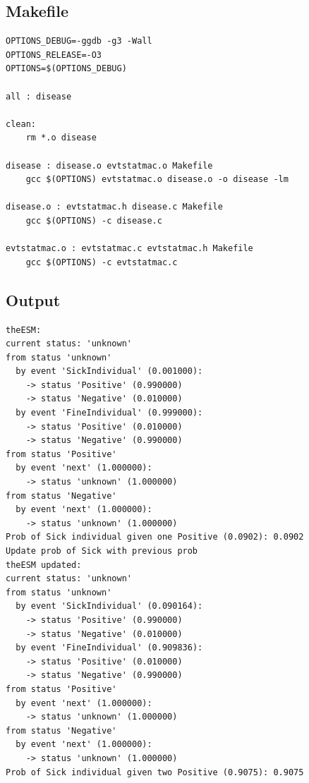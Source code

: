 \documentclass[12pt, a4paper]{article}
\begin{document}
\subsection{Makefile}

\begin{scriptsize}
\begin{ttfamily}
\begin{lstlisting}
OPTIONS_DEBUG=-ggdb -g3 -Wall
OPTIONS_RELEASE=-O3 
OPTIONS=$(OPTIONS_DEBUG)

all : disease

clean:
	rm *.o disease
	
disease : disease.o evtstatmac.o Makefile
	gcc $(OPTIONS) evtstatmac.o disease.o -o disease -lm

disease.o : evtstatmac.h disease.c Makefile
	gcc $(OPTIONS) -c disease.c

evtstatmac.o : evtstatmac.c evtstatmac.h Makefile
	gcc $(OPTIONS) -c evtstatmac.c
\end{lstlisting}
\end{ttfamily}
\end{scriptsize}

\subsection{Output}

\begin{scriptsize}
\begin{ttfamily}
\begin{lstlisting}
theESM:
current status: 'unknown'
from status 'unknown'
  by event 'SickIndividual' (0.001000):
    -> status 'Positive' (0.990000)
    -> status 'Negative' (0.010000)
  by event 'FineIndividual' (0.999000):
    -> status 'Positive' (0.010000)
    -> status 'Negative' (0.990000)
from status 'Positive'
  by event 'next' (1.000000):
    -> status 'unknown' (1.000000)
from status 'Negative'
  by event 'next' (1.000000):
    -> status 'unknown' (1.000000)
Prob of Sick individual given one Positive (0.0902): 0.0902
Update prob of Sick with previous prob
theESM updated:
current status: 'unknown'
from status 'unknown'
  by event 'SickIndividual' (0.090164):
    -> status 'Positive' (0.990000)
    -> status 'Negative' (0.010000)
  by event 'FineIndividual' (0.909836):
    -> status 'Positive' (0.010000)
    -> status 'Negative' (0.990000)
from status 'Positive'
  by event 'next' (1.000000):
    -> status 'unknown' (1.000000)
from status 'Negative'
  by event 'next' (1.000000):
    -> status 'unknown' (1.000000)
Prob of Sick individual given two Positive (0.9075): 0.9075
\end{lstlisting}
\end{ttfamily}
\end{scriptsize}
\end{document}
